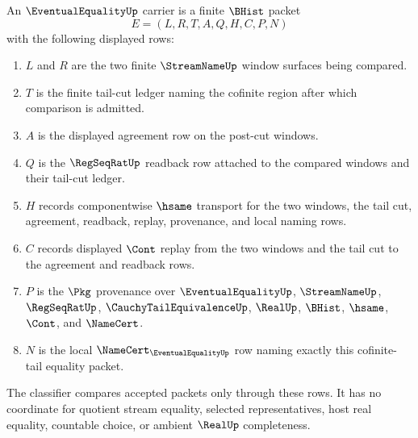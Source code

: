 \begin{definition}
\label{def:eventual-equality-carrier}
An $\EventualEqualityUp$ carrier is a finite $\BHist$ packet
$$
E=(L,R,T,A,Q,H,C,P,N)
$$
with the following displayed rows:
\begin{enumerate}
\item $L$ and $R$ are the two finite $\StreamNameUp$ window surfaces being compared.
\item $T$ is the finite tail-cut ledger naming the cofinite region after which comparison is admitted.
\item $A$ is the displayed agreement row on the post-cut windows.
\item $Q$ is the $\RegSeqRatUp$ readback row attached to the compared windows and their tail-cut ledger.
\item $H$ records componentwise $\hsame$ transport for the two windows, the tail cut, agreement, readback, replay, provenance, and local naming rows.
\item $C$ records displayed $\Cont$ replay from the two windows and the tail cut to the agreement and readback rows.
\item $P$ is the $\Pkg$ provenance over $\EventualEqualityUp$, $\StreamNameUp$, $\RegSeqRatUp$, $\CauchyTailEquivalenceUp$, $\RealUp$, $\BHist$, $\hsame$, $\Cont$, and $\NameCert$.
\item $N$ is the local $\NameCert_{\EventualEqualityUp}$ row naming exactly this cofinite-tail equality packet.
\end{enumerate}
The classifier compares accepted packets only through these rows. It has no coordinate for quotient stream equality, selected representatives, host real equality, countable choice, or ambient $\RealUp$ completeness.
\end{definition}

